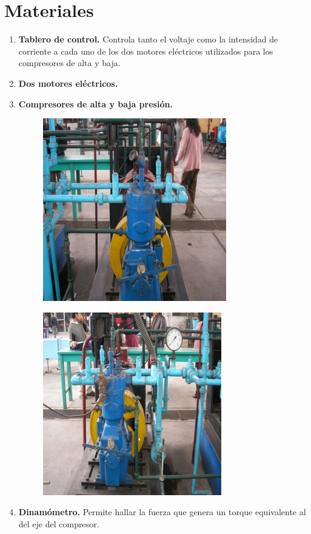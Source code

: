 \documentclass[a4paper,12pt]{report}
\begin{document}
\chapter{Materiales}
\begin{enumerate}
\item \textbf{Tablero de control.} Controla tanto  el voltaje como la  intensidad de corriente a cada uno de los dos motores eléctricos utilizados para los compresores de alta y baja.
\item \textbf{Dos motores eléctricos.}
\item \textbf{Compresores de alta y baja presión.}
\begin{figure}[H]
\centering
\includegraphics[scale=0.55]{Comp1.png}
\end{figure}
\begin{figure}[H]
\centering
\includegraphics[scale=0.55]{Comp2.png}
\end{figure}
\item \textbf{Dinamómetro.} Permite hallar la fuerza que genera un torque equivalente al del eje del compresor.

\end{enumerate}
\end{document}
